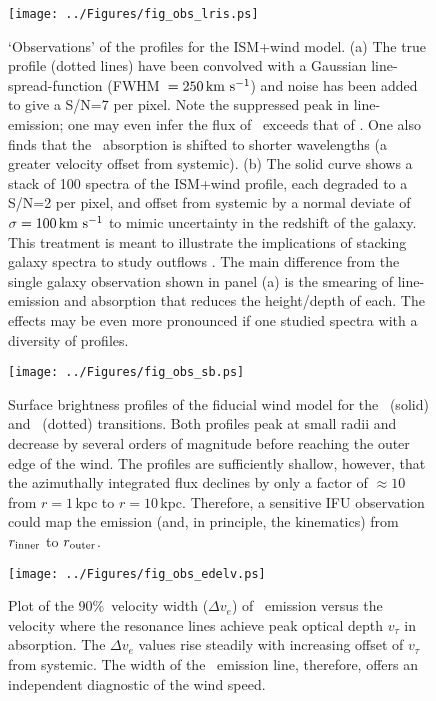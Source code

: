 \documentclass[12pt,preprint]{aastex}
\begin{document}
\begin{figure}
\texttt{[image: ../Figures/fig\_obs\_lris.ps]}
\caption{
`Observations' of the  profiles for the ISM+wind model.  
(a) The true profile (dotted lines) have been convolved with a
Gaussian line-spread-function (FWHM~$= 250 \, {\rm km~s^{-1}}$) and noise has been
added to give a S/N=7 per pixel.  Note the suppressed peak in 
line-emission; one may even infer the flux of \mgiia\ exceeds that of
\mgiib.  One also finds that the \mgiia\ absorption is shifted to
shorter wavelengths (a greater velocity offset from systemic).  
(b) The solid curve shows a stack of 100 spectra of the ISM+wind
profile, each degraded to a S/N=2 per pixel, and offset from systemic
by a normal deviate of $\sigma = 100 \, {\rm km~s^{-1}}$ to mimic uncertainty in
the redshift of the galaxy.  
This treatment is meant to illustrate the
implications of stacking galaxy spectra to study outflows
\citep[e.g.][]{wcp+09,smn+09,rwk+10}.   The main difference from the
single galaxy observation shown in panel (a) is the smearing of
line-emission and absorption that reduces the height/depth of each.
The effects may be even more pronounced if one studied spectra with
a diversity of  profiles.    
}
\label{fig:obs_lris}
\end{figure}

\begin{figure}
\texttt{[image: ../Figures/fig\_obs\_sb.ps]}
\caption{
Surface brightness profiles of the fiducial wind model for the \mgiia\
(solid) and \feiid\ (dotted) transitions.  Both profiles peak at small
radii and decrease by several orders of magnitude before reaching the
outer edge of the wind.  The profiles are sufficiently shallow,
however, that the azimuthally integrated flux declines by only a
factor of $\approx 10$ from $r = 1$\,kpc to $r=10$\,kpc.  Therefore, a
sensitive IFU observation could map the emission (and, in principle,
the kinematics) from $r_{\rm inner}$ to $r_{\rm outer}$.
}
\label{fig:obs_sb}
\end{figure}

\begin{figure}
\texttt{[image: ../Figures/fig\_obs\_edelv.ps]}
\caption{
Plot of the 90\%\ velocity width ($\Delta v_e$) of \feiic\ emission versus the
velocity where the resonance lines achieve peak optical depth
$v_\tau$ in absorption.  The $\Delta v_e$ values rise steadily with
increasing offset of $v_\tau$ from systemic.  The width of the \feiic\
emission line, therefore, offers an independent diagnostic of the wind
speed.
}
\label{fig:obs_edelv}
\end{figure}
\end{document}
